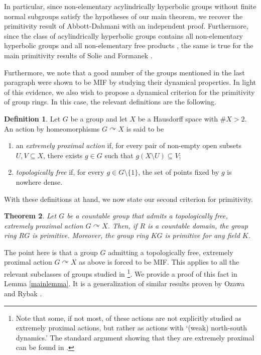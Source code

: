 \documentclass[11pt]{article}
\newtheorem{thm}{Theorem}[section]
\theoremstyle{definition}
\newtheorem{defn}[thm]{Definition}
\theoremstyle{remark}
\numberwithin{equation}{section}
\numberwithin{equation}{section}
\numberwithin{equation}{section}
\begin{document}
In particular, since non-elementary acylindrically hyperbolic groups without finite normal subgroups satisfy the hypotheses of our main theorem, we recover the primitivity result of Abbott-Dahmani \cite[Theorem 0.4]{AbDa19} with an independent proof. Furthermore, since the class of acylindrically hyperbolic groups contains all non-elementary hyperbolic groups and all non-elementary free products \cite{MiOs15,Os16}, the same is true for the main primitivity results of Solie \cite{So18} and Formanek \cite{Fo73}. 


Furthermore, we note that a good number of the groups mentioned in the last paragraph were shown to be MIF by studying their dynamical properties. In light of this evidence, we also wish to propose a dynamical criterion for the primitivity of group rings. In this case, the relevant definitions are the following.


\begin{defn}\label{thedef}
Let $G$ be a group and let $X$ be a Hausdorff space with $\# X>2$. An action by homeomorphisms $G\curvearrowright X$ is said to be 
\begin{enumerate}
    \item an \emph{extremely proximal action} if, for every pair of non-empty open subsets $U,V\subseteq X$, there exists $g\in G$ such that $g(X\setminus U)\subseteq V$;
    \item \emph{topologically free} if, for every $g\in G\setminus\{1\}$, the set of points fixed by $g$ is nowhere dense.
\end{enumerate}
\end{defn}

With these definitions at hand, we now state our second criterion for primitivity. 

\begin{thm}\label{mainthm2}
   Let $G$ be a countable group that admits a topologically free, extremely proximal action $G\curvearrowright X$. Then, if $R$ is a countable domain, the group ring $RG$ is primitive. Moreover, the group ring $KG$ is primitive for any field $K$.
\end{thm}

The point here is that a group $G$ admitting a topologically free, extremely proximal action $G\curvearrowright X$ as above is forced to be MIF. This applies to all the relevant subclasses of groups studied in \cite{AbDa19,BrIvOm20,FLMS,Yan25,BaFl26,Ry26}\footnote{Note that some, if not most, of these actions are not explicitly studied as extremely proximal actions, but rather as actions with `(weak) north-south dynamics.' The standard argument showing that they are extremely proximal can be found in \cite[Lemma 2.4]{BaFl26}.}. We provide a proof of this fact in Lemma \ref{mainlemma}. It is a generalization of similar results proven by Ozawa \cite{Oz25} and Rybak \cite{Ry26}.
\end{document}
